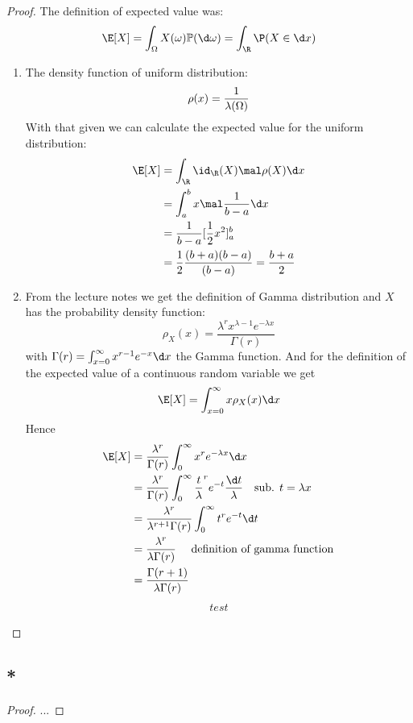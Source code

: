 \subsection{}
\begin{proof}
	The definition of expected value was:
	\[
	\E[X] = \int_{\O} X(\omega)\meas(\d \omega) = \int_{\R} \P(X \in \d x)
	\]
	\begin{enumerate}
		\item The density function of uniform distribution: 
		\[
			\rho(x) = \frac{1}{\lambda(\Omega)}
		\]
		With that given we can calculate the expected value for the uniform distribution:
		\begin{align*}
			\E[X] &= \int_{\R} \id_{\R} (X) \mal \rho(X) \d x\\
			&= \int_a^b x \mal \frac{1}{b-a} \d x\\
			&= \frac{1}{b-a} [\frac{1}{2} x^2]_a^b\\
			&= \frac{1}{2} \frac{(b+a)(b-a)}{(b-a)} = \frac{b+a}{2}
		\end{align*}
		\item From the lecture notes we get the definition of Gamma distribution and $X$ has the probability density function: %
		\[
			\rho_X (x) = \frac{\lambda^r x^{\lambda -1}e^{-\lambda x}}{\Gamma(r)}
		\] with $\Gamma(r) = \int_{x=0}^{\infty} x^{r-1}e^{-x}\d x$ the Gamma function. And for the definition of the expected value of a continuous random variable we get
		\[
			\E[X] = \int_{x=0}^{\infty}x \rho_X (x) \d x
		\]
		Hence
		\begin{align*}
			\E [X] &= \frac{\lambda^r}{\Gamma(r)} \int_0^{\infty} x^r e^{-\lambda x} \d x\\
			&= \frac{\lambda^r}{\Gamma(r)} \int_0^{\infty} \frac{t}{\lambda}^r e^{-t} \frac{\d t}{\lambda}\quad \text{sub. } t = \lambda x\\
			&= \frac{\lambda^r}{\lambda^{r+1}\Gamma(r)}\int_0^{\infty} t^r e^{-t} \d t\\
			&= \frac{\lambda^r}{\lambda \Gamma(r)} \quad \text{ definition of gamma function}\\
			&= \frac{\Gamma(r + 1)}{\lambda\Gamma(r)}
		\end{align*}
		\begin{align*}
			test
		\end{align*}
	\end{enumerate}
\end{proof}

\subsection{*}
\begin{proof}
	...
\end{proof}